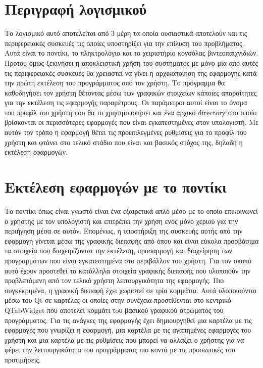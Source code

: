 





\section{Περιγραφή λογισμικού}


Το λογισμικό αυτό αποτελείται από 3 μέρη τα οποία ουσιαστικά αποτελούν και
τις περιφερειακές συσκευές τις οποίες υποστηρίζει για την επίλυση του προβλήματος.
Αυτά είναι το ποντίκι, το πληκτρολόγιο και το χειριστήριο κονσόλας βιντεοπαιχνιδιών.
Προτού όμως ξεκινήσει η αποκλειστική χρήση του συστήματος με μόνο μία από αυτές
τις περιφερειακές συσκευές θα χρειαστεί να γίνει η αρχικοποίηση της εφαρμογής κατά
την πρώτη εκτέλεση του προγράμματος από τον χρήστη. Το πρόγραμμα θα καθοδηγήσει τον
χρήστη θέτοντας μέσω των γραφικών στοιχείων κάποιες απαραίτητες για την εκτέλεση
τις εφαρμογής παραμέτρους. Οι παράμετροι αυτοί είναι το όνομα του προφίλ του χρήστη
που θα το χρησιμοποιήσει και ένα αρχικό directory στο οποίο βρίσκονται οι περισσότερες
εφαρμογές που είναι εγκατεστημένες στον υπολογιστή. Με αυτόν τον τρόπο η εφαρμογή 
θέτει τις προεπιλεγμένες ρυθμίσεις για το προφίλ του χρήστη και φτάνει στο τελικό
στάδιο που είναι και βασικός στόχος της, δηλαδή η εκτέλεση εφαρμογών.

\section{Εκτέλεση εφαρμογών με το ποντίκι}


Το ποντίκι όπως είναι γνωστό είναι ένα εξαιρετικά απλό μέσο με το οποίο επικοινωνεί
ο χρήστης με τον υπολογιστή και επιτρέπει την χρήση ενός μόνο χεριού για την περιήγηση
μέσα σε αυτόν. Επομένως, η υποστήριξη της συσκευής αυτής από την εφαρμογή γίνεται
μέσω της γραφικής διεπαφής από όπου και είναι εύκολα προσβάσιμα τα στοιχεία που
διαχειρίζονται την εκτέλεση, προσαρμογή και διαχείρηση των προγραμμάτων που είναι
εγκατεστημένα στο περιβάλλον του χρήστη. Για τον σκοπό αυτό έχουν προστεθεί τα κατάλληλα
στοιχεία γραφικής διεπαφής που υλοποιούν την προβλεπόμενη από τον τελικό χρήστη 
λειτουργικότητα της εφαρμογής. Πιο συγκεκριμένα, η γραφική διεπαφή έχει χωριστεί σε τρία κομμάτια.
Αυτά υλοποιούνται μέσω του Qt σε καρτέλες οι οποίες στην συνέχεια προστίθενται στο
κεντρικό QTabWidget που αποτελεί κομμάτι τoυ βασικού γραφικού στρώματος του προγράμματος.
Για τις ανάγκες της εφαρμογής έχει δημιουργηθεί μια καρτέλα με τις εφαρμογές που γνωρίζει
η εφαρμογή, μια καρτέλα με τις αγαπημένες εφαρμογές του χρήστη και μια καρτέλα με τις
ρυθμίσεις που μπορεί να αλλάξει ο χρήστης για να φέρει την λειτουργικότητα του προγράμματος
πιο κοντά με τις προσωπικές του προτιμήσεις.

